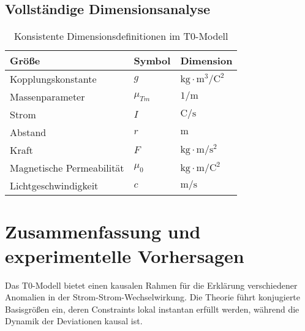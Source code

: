\documentclass[10pt, a4paper]{article}
\begin{document}
	\subsection{Vollständige Dimensionsanalyse}
	\begin{table}[h]
		\centering
		\begin{tabular}{lll}
			\hline
			Größe & Symbol & Dimension \\
			\hline
			Kopplungskonstante & $g$ & $\text{kg} \cdot \text{m}^3/\text{C}^2$ \\
			Massenparameter & $\mu_{Tm}$ & $1/\text{m}$ \\
			Strom & $I$ & $\text{C}/\text{s}$ \\
			Abstand & $r$ & $\text{m}$ \\
			Kraft & $F$ & $\text{kg} \cdot \text{m}/\text{s}^2$ \\
			Magnetische Permeabilität & $\mu_0$ & $\text{kg} \cdot \text{m}/\text{C}^2$ \\
			Lichtgeschwindigkeit & $c$ & $\text{m}/\text{s}$ \\
			\hline
		\end{tabular}
		\caption{Konsistente Dimensionsdefinitionen im T0-Modell}
		\label{tab:dimensions}
	\end{table}
	
	\section{Zusammenfassung und experimentelle Vorhersagen}
	Das T0-Modell bietet einen kausalen Rahmen für die Erklärung verschiedener Anomalien in der Strom-Strom-Wechselwirkung. Die Theorie führt konjugierte Basisgrößen ein, deren Constraints lokal instantan erfüllt werden, während die Dynamik der Deviationen kausal ist.
	
\end{document}
